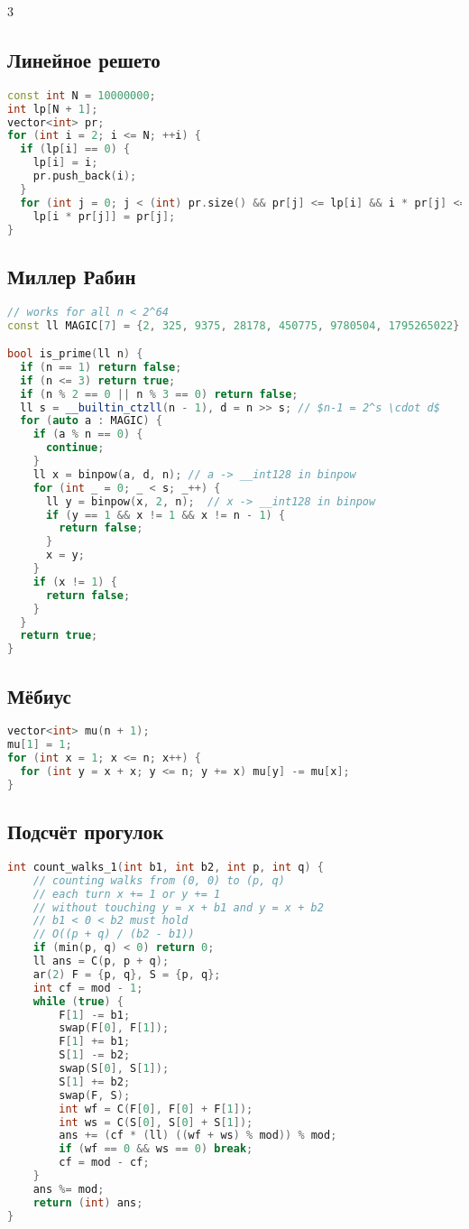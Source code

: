 \documentclass[9pt,a4paper,landscape,twosided]{extarticle}
\begin{document}
\begin{multicols*}{3}
\subsection{Линейное решето}
\begin{lstlisting}[language=C++]
const int N = 10000000;
int lp[N + 1];
vector<int> pr;
for (int i = 2; i <= N; ++i) {
  if (lp[i] == 0) {
    lp[i] = i;
    pr.push_back(i);
  }
  for (int j = 0; j < (int) pr.size() && pr[j] <= lp[i] && i * pr[j] <= N; ++j)
    lp[i * pr[j]] = pr[j];
}
\end{lstlisting}

\subsection{Миллер Рабин}
\begin{lstlisting}[language=C++]
// works for all n < 2^64
const ll MAGIC[7] = {2, 325, 9375, 28178, 450775, 9780504, 1795265022};

bool is_prime(ll n) {
  if (n == 1) return false;
  if (n <= 3) return true;
  if (n % 2 == 0 || n % 3 == 0) return false;
  ll s = __builtin_ctzll(n - 1), d = n >> s; // $n-1 = 2^s \cdot d$
  for (auto a : MAGIC) {
    if (a % n == 0) {
      continue;
    }
    ll x = binpow(a, d, n); // a -> __int128 in binpow
    for (int _ = 0; _ < s; _++) {
      ll y = binpow(x, 2, n);  // x -> __int128 in binpow
      if (y == 1 && x != 1 && x != n - 1) {
        return false;
      }
      x = y;
    }
    if (x != 1) {
      return false;
    }
  }
  return true;
}
\end{lstlisting}

\subsection{Мёбиус}
\begin{lstlisting}[language=C++]
vector<int> mu(n + 1);
mu[1] = 1;
for (int x = 1; x <= n; x++) {
  for (int y = x + x; y <= n; y += x) mu[y] -= mu[x];
}
\end{lstlisting}

\subsection{Подсчёт прогулок}
\begin{lstlisting}[language=C++]
int count_walks_1(int b1, int b2, int p, int q) {
    // counting walks from (0, 0) to (p, q)
    // each turn x += 1 or y += 1
    // without touching y = x + b1 and y = x + b2
    // b1 < 0 < b2 must hold
    // O((p + q) / (b2 - b1))
    if (min(p, q) < 0) return 0;
    ll ans = C(p, p + q);
    ar(2) F = {p, q}, S = {p, q};
    int cf = mod - 1;
    while (true) {
        F[1] -= b1;
        swap(F[0], F[1]);
        F[1] += b1;
        S[1] -= b2;
        swap(S[0], S[1]);
        S[1] += b2;
        swap(F, S);
        int wf = C(F[0], F[0] + F[1]);
        int ws = C(S[0], S[0] + S[1]);
        ans += (cf * (ll) ((wf + ws) % mod)) % mod;
        if (wf == 0 && ws == 0) break;
        cf = mod - cf;
    }
    ans %= mod;
    return (int) ans;
}


\end{lstlisting}
\end{multicols*}
\end{document}
